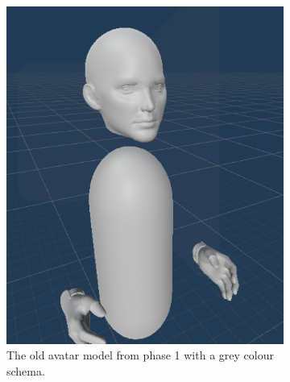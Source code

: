 \begin{figure}[]
  \centering
  \begin{subfigure}[b]{0.4\textwidth}
    \includegraphics[width=1\textwidth]{fig/phase_2/implementation/oldAvatar1.png}
    \caption{The old avatar model from phase 1 with a grey colour schema.}
    \label{fig:oldAvatar}
  \end{subfigure}
    \hfill%
  \begin{subfigure}[b]{0.4\textwidth}

\end{subfigure}
\end{figure}
